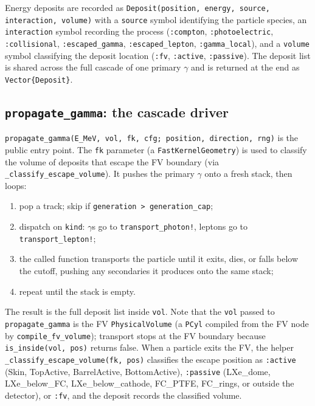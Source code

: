 \documentclass[11pt]{article}
\begin{document}
Energy deposits are recorded as
\texttt{Deposit(position, energy, source, interaction, volume)} with a
\texttt{source} symbol identifying the particle species, an
\texttt{interaction} symbol recording the process
(\texttt{:compton}, \texttt{:photoelectric}, \texttt{:collisional},
\texttt{:escaped\_gamma}, \texttt{:escaped\_lepton}, \texttt{:gamma\_local}),
and a \texttt{volume} symbol classifying the deposit location
(\texttt{:fv}, \texttt{:active}, \texttt{:passive}).
The deposit list is shared across the full cascade
of one primary $\gamma$ and is returned at the end as
\texttt{Vector\{Deposit\}}.

\subsection{\texttt{propagate\_gamma}: the cascade driver}
\label{sec:fullstack-driver}

\texttt{propagate\_gamma(E\_MeV, vol, fk, cfg; position, direction, rng)} is the
public entry point. The \texttt{fk} parameter (a \texttt{FastKernelGeometry})
is used to classify the volume of deposits that escape the FV boundary
(via \texttt{\_classify\_escape\_volume}). It pushes the primary $\gamma$
onto a fresh stack, then
loops:
\begin{enumerate}[label=\arabic*.]
\item pop a track; skip if \texttt{generation > generation\_cap};
\item dispatch on \texttt{kind}: $\gamma$s go to \texttt{transport\_photon!},
leptons go to \texttt{transport\_lepton!};
\item the called function transports the particle until it exits, dies, or
falls below the cutoff, pushing any secondaries it produces onto the same
stack;
\item repeat until the stack is empty.
\end{enumerate}
The result is the full deposit list inside \texttt{vol}. Note that the
\texttt{vol} passed to \texttt{propagate\_gamma} is the FV
\texttt{PhysicalVolume} (a \texttt{PCyl} compiled from the FV node by
\texttt{compile\_fv\_volume}); transport stops at the FV boundary because
\texttt{is\_inside(vol, pos)} returns false. When a particle exits the
FV, the helper \texttt{\_classify\_escape\_volume(fk, pos)} classifies the
escape position as \texttt{:active} (Skin, TopActive, BarrelActive,
BottomActive), \texttt{:passive} (LXe\_dome, LXe\_below\_FC,
LXe\_below\_cathode, FC\_PTFE, FC\_rings, or outside the detector), or
\texttt{:fv}, and the deposit records the classified volume.
\end{document}
